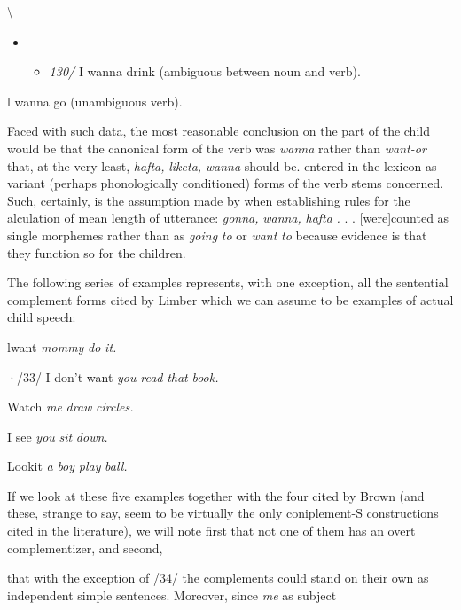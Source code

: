 {\textbackslash}


\begin{itemize}
\item \begin{itemize}
\item \textit{130/} I wanna drink (ambiguous between noun and verb).
\end{itemize}
\end{itemize}

\ea\label{ex:31}
 l wanna go (unambiguous verb).
\glt
\z

Faced with such data, the most reasonable conclusion on the part of the child would be that the canonical form of the verb was \textit{wanna} rather than \textit{want-or} that, at the very least, \textit{hafta,} \textit{liketa,} \textit{wanna} should be. entered in the lexicon as variant (perhaps phonologically condi\-tioned) forms of the verb stems concerned. Such, certainly, is the assumption made by \citet[54]{Brown1973} when establishing rules for the alculation of mean length of utterance: \textit{{\textquotedbl}gonna,} \textit{wanna,} \textit{hafta} \textit{.} . . [were]counted as single morphemes rather than as \textit{going} \textit{to} or \textit{want} \textit{to} because evidence is that they function so for the children.{\textquotedbl}

The following series of examples represents, with one exception, all the sentential complement forms cited by Limber which we can assume to be examples of actual child speech:

\ea\label{ex:32}
 lwant \textit{mommy} \textit{do} \textit{it.}
\glt
\z

·/33/ I don't want \textit{you} \textit{read} \textit{that} \textit{book.}

\ea\label{ex:34}
 Watch \textit{me} \textit{draw} \textit{circles.}
\glt
\z

\ea\label{ex:35}
 I see \textit{you} \textit{sit} \textit{down.}
\glt
\z

\ea\label{ex:36}
 Lookit \textit{a} \textit{boy} \textit{play} \textit{ball.}
\glt
\z

If we look at these five examples together with the four cited by Brown (and these, strange to say, seem to be virtually the only coniplement-S constructions cited in the literature), we will note first that not one of them has an overt complementizer, and second,

that with the exception of /34/ the complements could stand on their own as independent simple sentences. Moreover, since \textit{me} as subject

